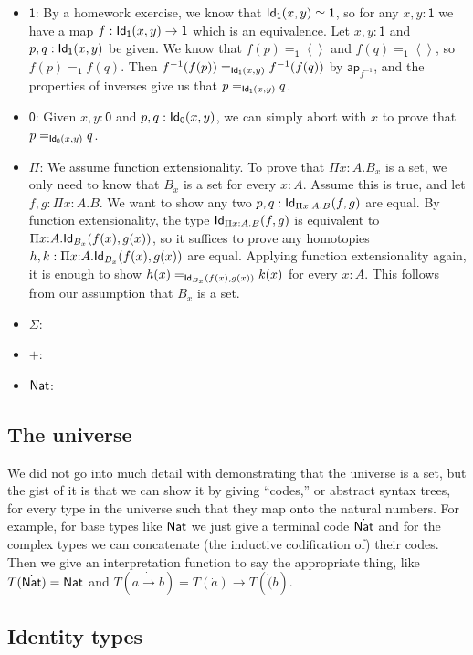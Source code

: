 \documentclass[11pt]{article}
\newcommand*{\Void}{\mathsf{0}}
\newcommand*{\Unit}{\mathsf{1}}
\newcommand*{\ap}{\mathsf{ap}}
\begin{document}
\begin{itemize}
\item 
  $\Unit$: By a homework exercise, we know that $\Id{\Unit}(x,y) \simeq \Unit$, so for any $x,y : \Unit$ we have a map $f : \Id{\Unit}(x,y) \to \Unit$ which is an equivalence. Let $x,y : \Unit$ and $p, q : \Id{\Unit}(x,y)$ be given. We know that $f(p) =_\Unit \left<\right>$ and $f(q) =_\Unit \left<\right>$, so $f(p) =_\Unit f(q)$. Then $f^{-1}(f(p)) =_{\Id{\Unit}(x,y)} f^{-1}(f(q))$ by $\ap_{f^{-1}}$, and the properties of inverses give us that $p =_{\Id{\Unit}(x,y)} q$.
\item
  $\Void$: Given $x,y : \Void$ and $p, q : \Id{\Void}(x,y)$, we can simply abort with $x$ to prove that $p =_{\Id{\Void}(x,y)} q$.
\item
  $\Pi$: We assume function extensionality. To prove that $\Pi x{:}A. B_x$ is a set, we only need to know that $B_x$ is a set for every $x{:}A$. Assume this is true, and let $f, g : \Pi x{:}A. B$. We want to show any two $p, q : \mathsf{Id}_{\Pi x {:}A. B}(f,g)$ are equal. By function extensionality, the type $\mathsf{Id}_{\Pi x {:}A. B}(f,g)$ is equivalent to $\Pi x{:}A. \mathsf{Id}_{B_x}(f(x), g(x))$, so it suffices to prove any homotopies $h, k : \Pi x{:}A. \mathsf{Id}_{B_x}(f(x), g(x))$ are equal. Applying function extensionality again, it is enough to show $h(x) =_{\mathsf{Id}_{B_x}(f(x),g(x))} k(x)$ for every $x{:}A$. This follows from our assumption that $B_x$ is a set.
\item
  $\Sigma$: 
\item
  $+$: 
\item
  $\mathsf{Nat}$: 
\end{itemize}

\subsection*{The universe}

We did not go into much detail with demonstrating that the universe is a
set, but the gist of it is that we can show it by giving ``codes,'' or abstract
syntax trees, for every type in the universe such that they map onto
the natural numbers. For example, for base types like $\mathsf{Nat}$ we just give a
terminal code $\dot{\mathsf{Nat}}$ and for the complex types we can concatenate
(the inductive codification of) their codes. Then we give an interpretation
function to say the appropriate thing, like $T(\dot{\mathsf{Nat}}) = \mathsf{Nat}$ and
$T(a\dot{\to}b) = T(\dot{a}) \to T(\dot(b)$.

\subsection*{Identity types}
\end{document}
